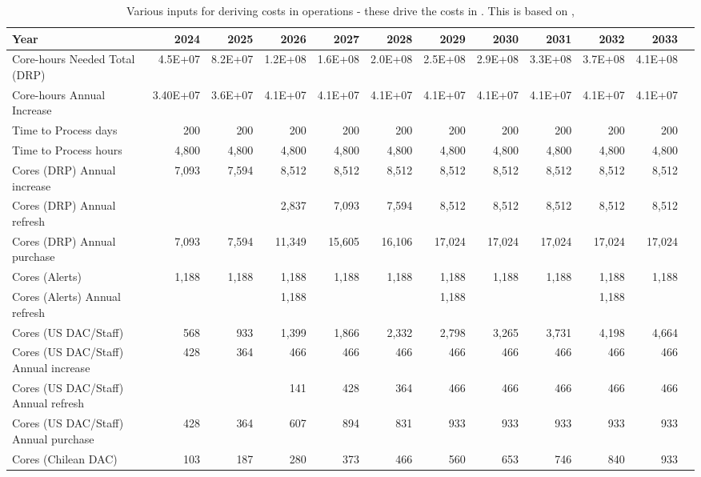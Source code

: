 \tiny \begin{longtable} { |p{}  |r  |r  |r  |r  |r  |r  |r  |r  |r  |r  |r |} 
\caption{Various inputs for deriving costs in operations - these drive the costs in . This is based on ,   \label{tab:opsInputs}}\\ 
\hline 
\textbf{Year}&\textbf{2024}&\textbf{2025}&\textbf{2026}&\textbf{2027}&\textbf{2028}&\textbf{2029}&\textbf{2030}&\textbf{2031}&\textbf{2032}&\textbf{2033} \\ \hline
{Core-hours Needed Total (DRP)}&{4.5E+07}&{8.2E+07}&{1.2E+08}&{1.6E+08}&{2.0E+08}&{2.5E+08}&{2.9E+08}&{3.3E+08}&{3.7E+08}&{4.1E+08} \\ \hline
{Core-hours Annual Increase}&{3.40E+07}&{3.6E+07}&{4.1E+07}&{4.1E+07}&{4.1E+07}&{4.1E+07}&{4.1E+07}&{4.1E+07}&{4.1E+07}&{4.1E+07} \\ \hline
{Time to Process days}&{200}&{200}&{200}&{200}&{200}&{200}&{200}&{200}&{200}&{200} \\ \hline
{Time to Process hours}&{4,800}&{4,800}&{4,800}&{4,800}&{4,800}&{4,800}&{4,800}&{4,800}&{4,800}&{4,800} \\ \hline
{Cores (DRP) Annual increase}&{7,093}&{7,594}&{8,512}&{8,512}&{8,512}&{8,512}&{8,512}&{8,512}&{8,512}&{8,512} \\ \hline
{Cores (DRP) Annual refresh}&{}&{}&{2,837}&{7,093}&{7,594}&{8,512}&{8,512}&{8,512}&{8,512}&{8,512} \\ \hline
{Cores (DRP) Annual purchase}&{7,093}&{7,594}&{11,349}&{15,605}&{16,106}&{17,024}&{17,024}&{17,024}&{17,024}&{17,024} \\ \hline
{Cores (Alerts)}&{1,188}&{1,188}&{1,188}&{1,188}&{1,188}&{1,188}&{1,188}&{1,188}&{1,188}&{1,188} \\ \hline
{Cores (Alerts) Annual refresh}&{}&{}&{1,188}&{}&{}&{1,188}&{}&{}&{1,188}& \\ \hline
{Cores (US DAC/Staff)}&{568}&{933}&{1,399}&{1,866}&{2,332}&{2,798}&{3,265}&{3,731}&{4,198}&{4,664} \\ \hline
{Cores (US DAC/Staff) Annual increase}&{428}&{364}&{466}&{466}&{466}&{466}&{466}&{466}&{466}&{466} \\ \hline
{Cores (US DAC/Staff) Annual refresh}&{}&{}&{141}&{428}&{364}&{466}&{466}&{466}&{466}&{466} \\ \hline
{Cores (US DAC/Staff) Annual purchase}&{428}&{364}&{607}&{894}&{831}&{933}&{933}&{933}&{933}&{933} \\ \hline
{Cores (Chilean DAC)}&{103}&{187}&{280}&{373}&{466}&{560}&{653}&{746}&{840}&{933} \\ \hline

\end{longtable}
